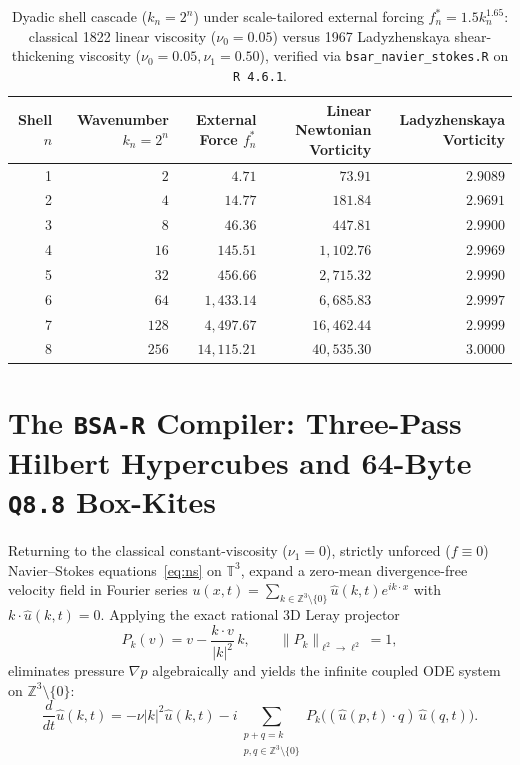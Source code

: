 \documentclass[11pt]{article}
\theoremstyle{plain}
\theoremstyle{definition}
\begin{document}
\begin{table}[htbp]
\centering
\caption{Dyadic shell cascade ($k_n = 2^n$) under scale-tailored external forcing $f_n^* = 1.5 k_n^{1.65}$: classical 1822 linear viscosity ($\nu_0 = 0.05$) versus 1967 Ladyzhenskaya shear-thickening viscosity ($\nu_0 = 0.05, \nu_1 = 0.50$), verified via \texttt{bsar\_navier\_stokes.R} on \texttt{R 4.6.1}.}\label{tab:oobleck}
\vspace{4pt}
\begin{tabular}{@{}rrrrr@{}}
\toprule
Shell $n$ & Wavenumber $k_n = 2^n$ & External Force $f_n^*$ & Linear Newtonian Vorticity & Ladyzhenskaya Vorticity \\
\midrule
1 & $2$   & $4.71$      & $73.91$     & $2.9089$ \\
2 & $4$   & $14.77$     & $181.84$    & $2.9691$ \\
3 & $8$   & $46.36$     & $447.81$    & $2.9900$ \\
4 & $16$  & $145.51$    & $1{,}102.76$  & $2.9969$ \\
5 & $32$  & $456.66$    & $2{,}715.32$  & $2.9990$ \\
6 & $64$  & $1{,}433.14$  & $6{,}685.83$  & $2.9997$ \\
7 & $128$ & $4{,}497.67$  & $16{,}462.44$ & $2.9999$ \\
8 & $256$ & $14{,}115.21$ & $40{,}535.30$ & $3.0000$ \\
\bottomrule
\end{tabular}
\end{table}

\section{The \texttt{BSA-R} Compiler: Three-Pass Hilbert Hypercubes and 64-Byte \texttt{Q8.8} Box-Kites}\label{sec:bsar}

Returning to the classical constant-viscosity ($\nu_1 = 0$), strictly unforced ($f \equiv 0$) Navier--Stokes equations~\eqref{eq:ns} on $\mathbb{T}^3$, expand a zero-mean divergence-free velocity field in Fourier series $u(x,t) = \sum_{k \in \mathbb{Z}^3 \setminus \{0\}} \hat{u}(k,t) e^{i k \cdot x}$ with $k \cdot \hat{u}(k,t) = 0$. Applying the exact rational 3D Leray projector
\begin{equation}\label{eq:leray}
  P_k(v) = v - \frac{k \cdot v}{|k|^2}\, k, \qquad \|P_k\|_{\ell^2 \to \ell^2} = 1,
\end{equation}
eliminates pressure $\nabla p$ algebraically and yields the infinite coupled ODE system on $\mathbb{Z}^3 \setminus \{0\}$:
\begin{equation}\label{eq:fourier_ns}
  \frac{d}{dt} \hat{u}(k,t) = -\nu |k|^2 \hat{u}(k,t) - i \sum_{\substack{p + q = k \\ p,q \in \mathbb{Z}^3 \setminus \{0\}}} P_k\!\Big((\hat{u}(p,t) \cdot q)\,\hat{u}(q,t)\Big).
\end{equation}
\end{document}
